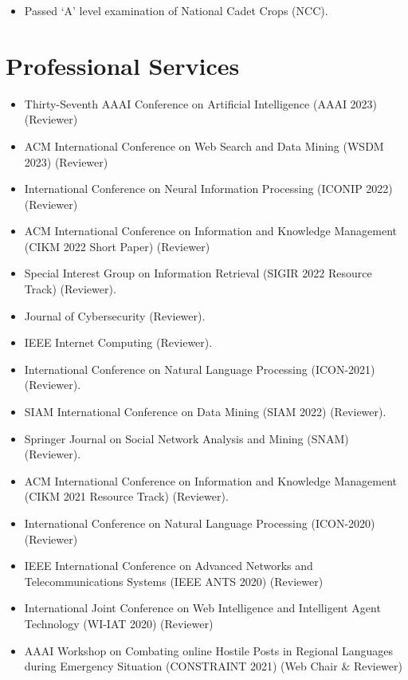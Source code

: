 \documentclass[margin, centered]{res}
\begin{document}
\begin{resume}
\begin{itemize}[leftmargin=*]
 \item Passed `A' level examination of National Cadet Crops (NCC).
\end{itemize}

\section{Professional Services}
\begin{itemize}[leftmargin=*]
\item Thirty-Seventh AAAI Conference on Artificial Intelligence (AAAI 2023) (Reviewer)
\item ACM International Conference on Web Search and Data Mining (WSDM 2023) (Reviewer)
\item International Conference on Neural Information Processing (ICONIP 2022) (Reviewer)
\item ACM International Conference on Information and Knowledge Management (CIKM 2022 Short Paper) (Reviewer)
\item Special Interest Group on Information Retrieval (SIGIR 2022 Resource Track) (Reviewer).
\item Journal of Cybersecurity (Reviewer).
\item IEEE Internet Computing (Reviewer).
\item International Conference on Natural Language Processing (ICON-2021) (Reviewer).
\item SIAM International Conference on Data Mining (SIAM 2022) (Reviewer).
\item Springer Journal on Social Network Analysis and Mining (SNAM)   (Reviewer).
   \item ACM International Conference on Information and Knowledge Management (CIKM 2021 Resource Track) (Reviewer).
    \item International Conference on Natural Language Processing (ICON-2020) (Reviewer)
    \item IEEE International Conference on Advanced Networks and Telecommunications Systems (IEEE ANTS 2020) (Reviewer)
    \item International Joint Conference on Web Intelligence and Intelligent Agent Technology (WI-IAT 2020) (Reviewer)
	\item AAAI Workshop on Combating online Hostile Posts in Regional Languages during Emergency Situation (CONSTRAINT 2021) (Web Chair \& Reviewer)

\end{itemize}
\end{resume}
\end{document}
